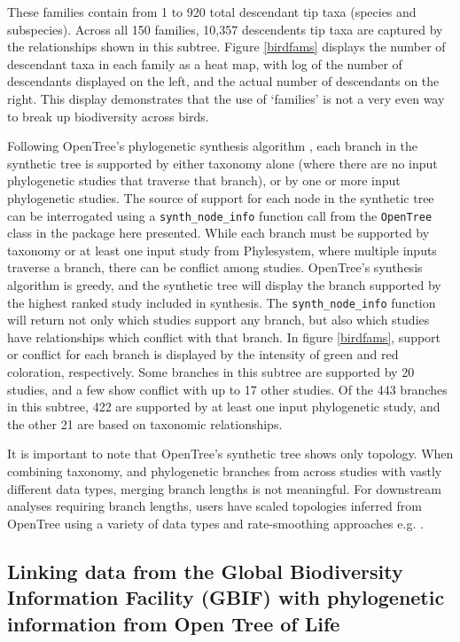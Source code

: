 \documentclass[oupdraft]{sysbio_sse}
\begin{document}
These families contain from 1 to 920 total descendant tip taxa (species and subspecies).
Across all 150 families, 10,357 descendents tip taxa are captured by the relationships shown in this subtree.
Figure \ref{birdfams} displays the number of descendant taxa in each family as a heat map, with log of the number of descendants displayed on the left, and the actual number of descendants on the right.
This display demonstrates that the use of `families' is not a very even way to break up biodiversity across birds.

Following OpenTree's phylogenetic synthesis algorithm \citep{redelings_supertree_2017}, each branch in the synthetic tree is supported
by either taxonomy alone (where there are no input phylogenetic studies that traverse that branch), or by one or more input phylogenetic studies.
The source of support for each node in the synthetic tree can be interrogated using a \texttt{synth\_node\_info} function call from the \texttt{OpenTree} class in the package here presented.
While each branch must be supported by taxonomy or at least one input study from Phylesystem, where multiple inputs traverse a branch, there can be conflict among studies.
OpenTree's synthesis algorithm is greedy, and the synthetic tree will display the branch supported by the highest ranked study included in synthesis.
The \texttt{synth\_node\_info} function will return not only which studies support any branch, but also which studies have relationships which conflict with that branch.
In figure \ref{birdfams}, support or conflict for each branch is displayed by the intensity of green and red coloration, respectively. Some branches in this subtree are supported by 20 studies, and a few show conflict with up to 17 other studies. Of the 443 branches in this subtree, 422 are supported by at least one input phylogenetic study, and the other 21 are based on taxonomic relationships.

It is important to note that OpenTree's synthetic tree shows only topology. When combining taxonomy, and phylogenetic branches from across studies with vastly different data types, merging branch lengths is not meaningful. For downstream analyses requiring branch lengths, users have scaled topologies inferred from OpenTree using a variety of data types and rate-smoothing approaches e.g. \citep{smith2018constructing, smith2019pyphlawd, eastman2013congruification, allen2019spatial, li2019common, uyeda2017evolution, geffroy2020evolutionary, jantzen2019effects, sanchez-reyes_datelife_2019}.

\subsection{Linking data from the Global Biodiversity Information Facility (GBIF) with phylogenetic information from Open Tree of Life}
\end{document}
